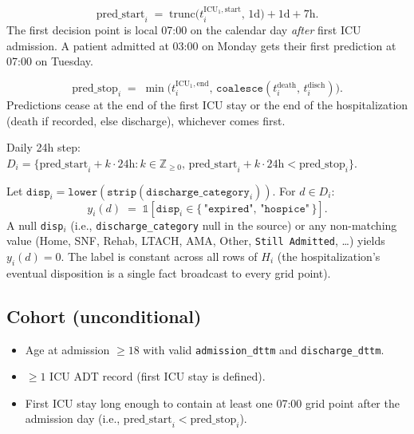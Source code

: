 \documentclass[11pt]{article}
\newcommand{\predstart}{\text{pred\_start}}
\newcommand{\predstop}{\text{pred\_stop}}
\begin{document}
\begin{description}[leftmargin=2em, style=nextline]

\item[Prediction-window start ($\predstart$).]
\[
\predstart_i \;=\; \text{trunc}\!\bigl(t^{\text{ICU}_1,\text{start}}_i,\,
1\text{d}\bigr) + 1\text{d} + 7\text{h}.
\]
The first decision point is local 07:00 on the calendar day \emph{after}
first ICU admission. A patient admitted at 03:00 on Monday gets their
first prediction at 07:00 on Tuesday.

\item[Prediction-window stop ($\predstop$).]
\[
\predstop_i \;=\; \min\!\bigl(t^{\text{ICU}_1,\text{end}}_i,\,
\texttt{coalesce}(t^{\text{death}}_i,\, t^{\text{disch}}_i)\bigr).
\]
Predictions cease at the end of the first ICU stay or the end of the
hospitalization (death if recorded, else discharge), whichever comes
first.

\item[Decision-point grid.]
Daily 24h step:
$D_i = \{\predstart_i + k\!\cdot\!24\text{h} : k\in\mathbb{Z}_{\ge 0},\,
\predstart_i + k\!\cdot\!24\text{h} < \predstop_i\}$.

\item[Label (\texttt{label\_mortality}).]
Let
$\texttt{disp}_i = \texttt{lower}(\texttt{strip}(\texttt{discharge\_category}_i))$.
For $d \in D_i$:
\[
y_i(d) \;=\; \mathbb{1}\!\left[ \texttt{disp}_i \in
\{\,\texttt{"expired"},\, \texttt{"hospice"}\,\} \right].
\]
A null \texttt{disp}$_i$ (i.e., \texttt{discharge\_category} null in
the source) or any non-matching value (Home, SNF, Rehab, LTACH, AMA,
Other, \texttt{Still Admitted}, \ldots) yields $y_i(d) = 0$. The label
is constant across all rows of $H_i$ (the hospitalization's eventual
disposition is a single fact broadcast to every grid point).

\end{description}

\subsection{Cohort (unconditional)}

\begin{itemize}[leftmargin=2em]
  \item Age at admission $\ge 18$ with valid \texttt{admission\_dttm}
        and \texttt{discharge\_dttm}.
  \item $\geq 1$ ICU ADT record (first ICU stay is defined).
  \item First ICU stay long enough to contain at least one 07:00 grid
        point after the admission day (i.e., $\predstart_i <
        \predstop_i$).
\end{itemize}
\end{document}
